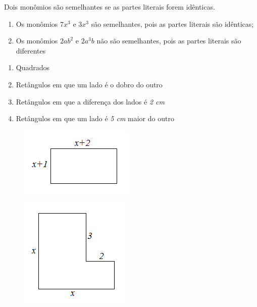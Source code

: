 \begin{tdefinicao}
Dois monômios são semelhantes se as partes literais forem idênticas.
\end{tdefinicao}

\begin{texemplo}
\begin{enumerate}[label=(\textbf{\alph*)}]
    \item Os monômios $7x^3$ e $3x^3$ são semelhantes, pois as partes literais são idênticas;
    
    \item Os monômios  $2ab^2$ e $2a^3b$ não são semelhantes, pois as partes literais são diferentes \qedsymbol
\end{enumerate}
\end{texemplo}

\begin{exercicios}
\begin{enumerate}[label=(\textbf{\alph*)}]
\item Quadrados
\item Retângulos em que um lado é o dobro do outro
\item Retângulos em que a diferença dos lados é \textit{2 cm}
\item Retângulos em que um lado é \textit{5 cm} maior do outro
\end{enumerate}

\begin{figure}[H]
  \includegraphics{capitulos/expressoes_algebricas/media/image3.png}
  \centering
\end{figure}

\begin{figure}[H]
  \includegraphics{capitulos/expressoes_algebricas/media/image4.png}
  \centering
\end{figure}


\end{exercicios}
